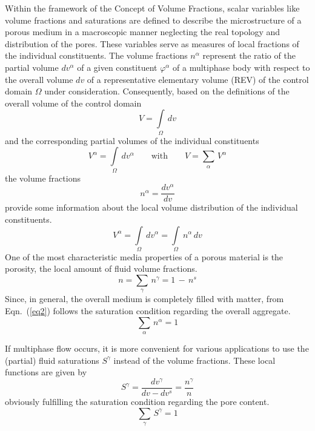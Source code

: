 Within the framework of the Concept of Volume Fractions, scalar variables like volume fractions and saturations are defined to describe the microstructure of a porous medium in a macroscopic manner neglecting the real topology and distribution of the pores. These variables serve as measures of local fractions of the individual constituents. The volume fractions $n^{\alpha}$ represent the ratio of the partial volume $dv^{\alpha}$ of a given constituent $\varphi^{\alpha}$ of a multiphase body with respect to the overall volume $dv$ of a representative elementary volume (REV) of the control domain $\Omega$ under consideration. Consequently, based on the definitions of the overall volume of the control domain
\begin{equation}
V=\int\limits_{\Omega}\,dv
\label{eq1}
\end{equation}
and the corresponding partial volumes of the individual constituents
\begin{equation}
V^{\alpha}=\int\limits_{\Omega}\,dv^{\alpha}\qquad\mbox{with}\qquad V=\sum\limits_{\alpha}\,V^{\alpha}
\label{eq2}
\end{equation}
the volume fractions
\begin{equation}
n^{\alpha}=\frac{dv^{\alpha}}{dv}
\label{eq3}
\end{equation}
provide some information about the local volume distribution of the individual constituents.
\begin{equation}
V^{\alpha}=\int\limits_{\Omega}\,dv^{\alpha}=\int\limits_{\Omega}\,n^{\alpha}\,dv
\label{eq4}
\end{equation}
One of the most characteristic media properties of a porous material is the porosity, the local amount of fluid volume fractions.
\begin{equation}
n=\sum\limits_{\gamma}\,n^{\gamma}=1\,-\,n^s
\label{eq5}
\end{equation}
Since, in general, the overall medium is completely filled with matter, from Eqn.~(\ref{eq2}) follows the saturation condition regarding the overall aggregate.
\begin{equation}
\sum\limits_{\alpha}\,n^{\alpha}=1
\label{eq6}
\end{equation}

If multiphase flow occurs, it is more convenient for various applications to use the (partial) fluid saturations $S^{\gamma}$ instead of the volume fractions. These local functions are given by
\begin{equation}
S^{\gamma}=\frac{dv^{\gamma}}{dv-dv^s}=\frac{n^{\gamma}}{n}
\label{eq7}
\end{equation}
obviously fulfilling the saturation condition regarding the pore content.
\begin{equation}
\sum\limits_{\gamma}\,S^{\gamma}=1
\label{eq8}
\end{equation}

